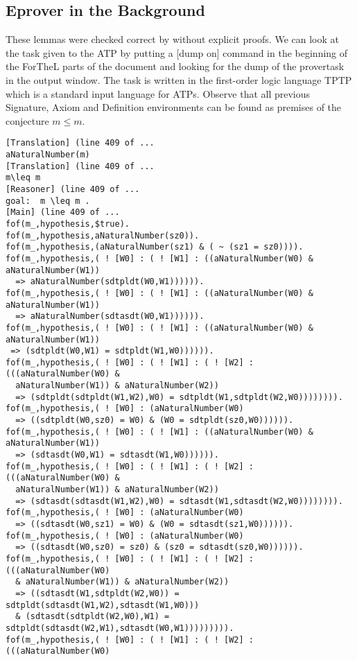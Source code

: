 \documentclass[11pt]{article}
\begin{document}
\subsection{Eprover in the Background}
These lemmas were checked correct by \Naproche{} without explicit proofs.
We can look at the task given to the ATP by putting 
a [dump on] command in the beginning of the ForTheL parts of the 
document and looking for the dump of the provertask in the
output window. The task is written in the first-order
logic language TPTP which is a standard input language for ATPs.
Observe that all previous Signature, Axiom and Definition
environments can be found as premises of the
conjecture $m \leq m$.
\begin{scriptsize}
\begin{verbatim}
[Translation] (line 409 of ...
aNaturalNumber(m) 
[Translation] (line 409 of ...
m\leq m 
[Reasoner] (line 409 of ...
goal:  m \leq m . 
[Main] (line 409 of ...
fof(m_,hypothesis,$true).
fof(m_,hypothesis,aNaturalNumber(sz0)).
fof(m_,hypothesis,(aNaturalNumber(sz1) & ( ~ (sz1 = sz0)))).
fof(m_,hypothesis,( ! [W0] : ( ! [W1] : ((aNaturalNumber(W0) & aNaturalNumber(W1)) 
  => aNaturalNumber(sdtpldt(W0,W1)))))).
fof(m_,hypothesis,( ! [W0] : ( ! [W1] : ((aNaturalNumber(W0) & aNaturalNumber(W1)) 
  => aNaturalNumber(sdtasdt(W0,W1)))))).
fof(m_,hypothesis,( ! [W0] : ( ! [W1] : ((aNaturalNumber(W0) & aNaturalNumber(W1)) 
 => (sdtpldt(W0,W1) = sdtpldt(W1,W0)))))).
fof(m_,hypothesis,( ! [W0] : ( ! [W1] : ( ! [W2] : (((aNaturalNumber(W0) & 
  aNaturalNumber(W1)) & aNaturalNumber(W2)) 
  => (sdtpldt(sdtpldt(W1,W2),W0) = sdtpldt(W1,sdtpldt(W2,W0)))))))).
fof(m_,hypothesis,( ! [W0] : (aNaturalNumber(W0) 
  => ((sdtpldt(W0,sz0) = W0) & (W0 = sdtpldt(sz0,W0)))))).
fof(m_,hypothesis,( ! [W0] : ( ! [W1] : ((aNaturalNumber(W0) & aNaturalNumber(W1)) 
  => (sdtasdt(W0,W1) = sdtasdt(W1,W0)))))).
fof(m_,hypothesis,( ! [W0] : ( ! [W1] : ( ! [W2] : (((aNaturalNumber(W0) & 
  aNaturalNumber(W1)) & aNaturalNumber(W2)) 
  => (sdtasdt(sdtasdt(W1,W2),W0) = sdtasdt(W1,sdtasdt(W2,W0)))))))).
fof(m_,hypothesis,( ! [W0] : (aNaturalNumber(W0) 
  => ((sdtasdt(W0,sz1) = W0) & (W0 = sdtasdt(sz1,W0)))))).
fof(m_,hypothesis,( ! [W0] : (aNaturalNumber(W0) 
  => ((sdtasdt(W0,sz0) = sz0) & (sz0 = sdtasdt(sz0,W0)))))).
fof(m_,hypothesis,( ! [W0] : ( ! [W1] : ( ! [W2] : (((aNaturalNumber(W0) 
  & aNaturalNumber(W1)) & aNaturalNumber(W2)) 
  => ((sdtasdt(W1,sdtpldt(W2,W0)) = sdtpldt(sdtasdt(W1,W2),sdtasdt(W1,W0))) 
  & (sdtasdt(sdtpldt(W2,W0),W1) = sdtpldt(sdtasdt(W2,W1),sdtasdt(W0,W1))))))))).
fof(m_,hypothesis,( ! [W0] : ( ! [W1] : ( ! [W2] : (((aNaturalNumber(W0) 

\end{verbatim}
\end{scriptsize}
\end{document}

